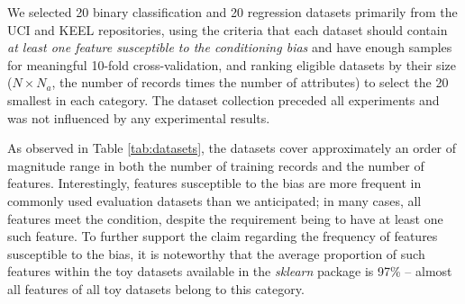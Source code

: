 \documentclass[5p,twocolumn,authoryear]{elsarticle}
\theoremstyle{plain}%
\theoremstyle{remark}%
\theoremstyle{definition}%
\begin{document}
We selected 20 binary classification and 20 regression datasets primarily from the UCI \citep{uci} and KEEL \citep{keel} repositories, using the criteria that each dataset should contain \emph{at least one feature susceptible to the conditioning bias} and have enough samples for meaningful 10-fold cross-validation, and ranking eligible datasets by their size ($N \times N_a$, the number of records times the number of attributes) to select the 20 smallest in each category. The dataset collection preceded all experiments and was not influenced by any experimental results.

\begin{table}[tbp]
  \caption{A summary of the key characteristics of the datasets used for evaluation, with $N$, $N_a$ and $N_b$ representing the number of records, attributes and the number of attributes susceptible to the bias, respectively. The counts of attributes were determined after the encoding of categorical attributes. $N_m$ denotes the number of minority samples in classification problems. The datasets are sorted by their size $N\cdot N_a$. Unless noted otherwise, classification datasets are drawn from KEEL \citep{keel} (\emph{hepatitis} from \citep{krnn}); regression datasets are drawn from KEEL \citep{keel}, UCI \citep{uci}, or \citep{krnn}, except \emph{medical-cost} \citep{mlwithr} and \emph{boom-bikes} \citep{boombikes}.}
  \label{tab:datasets}
  \centering
    \begin{footnotesize}
      \begin{minipage}[t]{0.48\textwidth}
        \centering
        
      \end{minipage}
      \hfill
      \begin{minipage}[t]{0.48\textwidth}
        \centering
        
      \end{minipage}
    \end{footnotesize}
\end{table}

As observed in Table \ref{tab:datasets}, the datasets cover approximately an order of magnitude range in both the number of training records and the number of features. Interestingly, features susceptible to the bias are more frequent in commonly used evaluation datasets than we anticipated; in many cases, all features meet the condition, despite the requirement being to have at least one such feature. To further support the claim regarding the frequency of features susceptible to the bias, it is noteworthy that the average proportion of such features within the toy datasets available in the \emph{sklearn} \citep{sklearn} package is 97\% -- almost all features of all toy datasets belong to this category.
\end{document}
